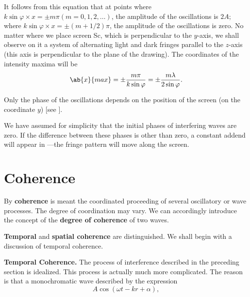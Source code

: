 It follows from this equation that at points where $k \sin\varphi \times x = \pm m\pi (m = 0, 1, 2, \ldots)$, the amplitude of the oscillations
is $2A$; where $k \sin\varphi \times x = \pm (m+1/2)\pi$, the amplitude of the oscillations
is zero.
No matter where we place screen Sc, which is perpendicular to the $y$-axis, we shall observe on it a system of alternating light and dark fringes parallel to the $z$-axis (this axis is perpendicular to the plane of the drawing).
The coordinates of the intensity maxima will be
\begin{equation}\label{eq:17_12}
    \ab{x}{max} = \pm \frac{m \pi}{k \sin\varphi} = \pm \frac{m \lambda}{2 \sin\varphi}.
\end{equation}

Only the phase of the oscillations depends on the position of the screen (on the coordinate $y$) [see ].

We have assumed for simplicity that the initial phases of interfering waves are zero.
If the difference between these phases is other than zero, a constant addend will appear in ---the fringe pattern will move along the screen.

\section{Coherence}\label{sec:17_2}

By \textbf{coherence} is meant the coordinated proceeding of several oscillatory or wave processes.
The degree of coordination may vary.
We can accordingly introduce the concept of the \textbf{degree of coherence} of two waves.

\textbf{Temporal} and \textbf{spatial coherence} are distinguished.
We shall begin with a discussion of temporal coherence.

\textbf{Temporal Coherence.}
The process of interference described in the preceding section is idealized.
This process is actually much more complicated.
The reason is that a monochromatic wave described
by the expression
\begin{equation*}
    A \cos(\omega t - kr + \alpha),
\end{equation*}

